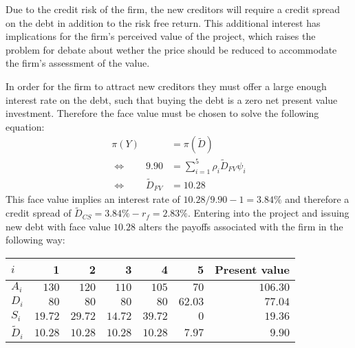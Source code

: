 \documentclass[../main.tex]{subfiles}
\begin{document}
        Due to the credit risk of the firm, the new creditors will require a credit spread on the debt in addition to the risk free return. This additional interest has implications for the firm's perceived value of the project, which raises the problem for debate about wether the price should be reduced to accommodate the firm's assessment of the value.

        In order for the firm to attract new creditors they must offer a large enough interest rate on the debt, such that buying the debt is a zero net present value investment. Therefore the face value must be chosen to solve the following equation:
            \begin{align}
                \pi(Y) &= \pi(\tilde{D}) \\
                \Leftrightarrow  \qquad
                9.90 &= \sum_{i=1}^{5} \rho_{i}\tilde{D}_{FV}\psi_{i} \\
                \Leftrightarrow  \qquad
                \tilde{D}_{FV} &= 10.28
            \end{align}
        This face value implies an interest rate of $10.28 / 9.90 - 1 = 3.84\%$ and therefore a credit spread of $\tilde{D}_{CS} = 3.84\% - r_{f} = 2.83\%$. Entering into the project and issuing new debt with face value $10.28$ alters the payoffs associated with the firm in the following way:
        \begin{table}[H]
            \centering
            \begin{tabular}{l|rrrrr||r}
                $i$ & 1 & 2 & 3 & 4 & 5 & Present value \\
                \hline
                $A_{i}$ & $130$ & $120$ & $110$ & $105$ & $70$ & $106.30$ \\
                $D_{i}$ & $80$ & $80$ & $80$ & $80$ & $62.03$ & $77.04$ \\
                $S_{i}$ & $19.72$ & $29.72$ & $14.72$ & $39.72$ & $0$ & $19.36$ \\
                $\tilde{D}_{i}$ & $10.28$ & $10.28$ & $10.28$ & $10.28$ & $7.97$ & $9.90$ \\
            \end{tabular}
        \end{table}
\end{document}
